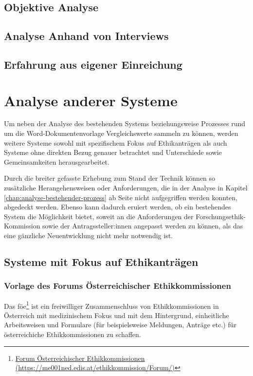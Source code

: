 \documentclass[a4paper,12pt,twoside]{scrreprt}
\begin{document}
\section{Objektive Analyse}

\section{Analyse Anhand von Interviews}

\section{Erfahrung aus eigener Einreichung}

\chapter{Analyse anderer Systeme}
\label{chap:analyse-anderer-systeme}

Um neben der Analyse des bestehenden Systems beziehungsweise Prozesses rund um die Word-Dokumentenvorlage Vergleichswerte sammeln zu können, werden weitere Systeme sowohl mit spezifischem Fokus auf Ethikanträgen als auch Systeme ohne direkten Bezug genauer betrachtet und Unterschiede sowie Gemeinsamkeiten herausgearbeitet.

Durch die breiter gefasste Erhebung zum Stand der Technik können so zusätzliche Herangehensweisen oder Anforderungen, die in der Analyse in Kapitel \ref{chap:analyse-bestehender-prozess} ab Seite \pageref{chap:analyse-anderer-systeme} nicht aufgegriffen werden konnten, abgedeckt werden. Ebenso kann dadurch eruiert werden, ob ein bestehendes System die Möglichkeit bietet, soweit an die Anforderungen der Forschungsethik-Kommission sowie der Antragssteller:innen angepasst werden zu können, als das eine gänzliche Neuentwicklung nicht mehr notwendig ist.

\section{Systeme mit Fokus auf Ethikanträgen}
\label{sec:systeme-mit-fokkus-ethikantrage}

\subsection{Vorlage des Forums Österreichischer Ethikkommissionen}
\label{sub-sec:vorlage-föe}

Das \ac{föe}\footnote{\href{https://me001ned.edis.at/ethikkommission/Forum/index.htm}{Forum Österreichischer Ethikkommissionen (\url{https://me001ned.edis.at/ethikkommission/Forum/)}}} ist ein freiwilliger Zusammenschluss von Ethikkommissionen in Österreich mit medizinischem Fokus und mit dem Hintergrund, einheitliche Arbeitsweisen und Formulare (für beispielsweise Meldungen, Anträge etc.) für österreichiche Ethikkommissionen zu schaffen. \cite{ethikkommission_der_medizinischen_universitat_graz_forum_2019}
\end{document}
